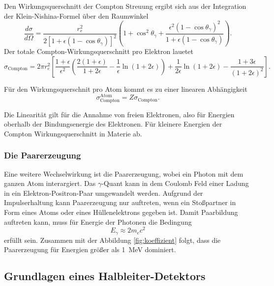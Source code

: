 Den Wirkungsquerschnitt der Compton Streuung ergibt sich aus der Integration der Klein-Nishina-Formel über den Raumwinkel
\begin{equation}
    \frac{d \sigma}{d \Omega}=\frac{r_e^2}{2\left[1+\epsilon\left(1-\cos \theta_\gamma\right)\right]^2}\left(1+\cos ^2 \theta_\gamma+\frac{\epsilon^2\left(1-\cos \theta_\gamma\right)^2}{1+\epsilon\left(1-\cos \theta_\gamma\right)}\right).
\end{equation}
Der totale Compton-Wirkungsquerschnitt pro Elektron lauetet
\begin{equation}
    \sigma_{\text{Compton}}=2 \pi r_e^2\left[\frac{1+\epsilon}{\epsilon^2}\left(\frac{2(1+\epsilon)}{1+2 \epsilon}-\frac{1}{\epsilon} \ln (1+2 \epsilon)\right)+\frac{1}{2 \epsilon} \ln (1+2 \epsilon)-\frac{1+3 \epsilon}{(1+2 \epsilon)^2}\right].
    \label{eqn:Compton_Wirkungsquerschnitt}
\end{equation}

Für den Wirkungsquerschnit pro Atom kommt es zu einer linearen Abhängigkeit
\begin{equation}
    \sigma_{\text{Compton}}^{\text{Atom}}=Z \sigma_{\text{Compton}}.
\end{equation}

Die Linearität gilt für die Annahme von freien Elektronen, also für Energien oberhalb der
Bindungsenergie des Elektronen.
Für kleinere Energien der Compton Wirkungsquerschnitt in Materie ab.

\subsubsection{Die Paarerzeugung}
\label{paarerzeugung}

Eine weitere Wechselwirkung ist die Paarerzeugung, wobei ein Photon mit dem ganzen Atom interargiert.
Das $\gamma$-Quant kann in dem Coulomb Feld einer Ladung in ein Elektron-Positron-Paar umgewandelt werden.
Aufgrund der Impulserhaltung kann Paarerzeugung nur auftreten, wenn ein Stoßpartner in Form eines Atoms oder eines Hüllenelektrons
gegeben ist.
Damit Paarbildung auftreten kann, muss für Energie der Photonen die Bedingung 
\begin{equation}
    E_\gamma \approx 2 m_e c^2
\end{equation}
erfüllt sein. 
Zusammen mit der Abbildung \ref{fig:koeffizient} folgt, dass die Paarerzeugung für Energien größer als \qty{1}{\mega\eV} dominiert.

\subsection{Grundlagen eines Halbleiter-Detektors}
\label{sec:Halbleiter-Detektor}